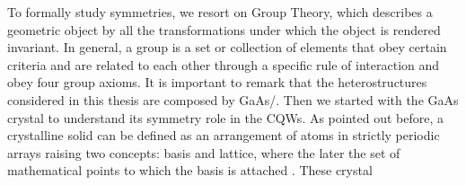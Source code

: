 To formally study symmetries, we resort on Group Theory, which describes a geometric object by all the transformations 
under which the object is rendered invariant. In general, a group is a set or collection of elements that obey certain criteria and are related to each other through a specific rule of interaction and obey four group axioms\cite{powell2010symmetry,cornwell1997group,muller2013symmetry}. 
It is important to remark that the heterostructures considered in this thesis are composed by GaAs/\algaas. Then  we started with the GaAs crystal to understand its symmetry role in the \gls{CQWs}. 
As pointed out before, a crystalline solid can  be defined as an arrangement of atoms in strictly periodic arrays \cite{kittel2018kittel,solyom2007fundamentals} raising two concepts: basis and lattice, where the later
the set of mathematical points to which the basis is attached \cite{kittel2018kittel}. These crystal

